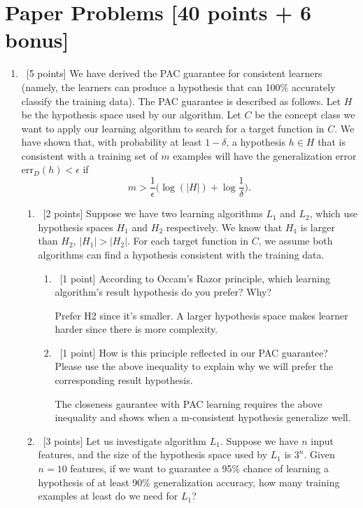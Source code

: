 \documentclass[12pt, fullpage,letterpaper]{article}
\begin{document}
\section{Paper Problems [40 points + 6 bonus]}
\begin{enumerate}
\item~[5 points] We have derived the PAC guarantee for consistent learners (namely, the learners can produce a hypothesis that can 100\% accurately classify the training data). The PAC guarantee is described as follows. Let $H$ be the hypothesis space used by our algorithm. Let $C$ be the concept class we want to apply our learning algorithm to search for a target function in $C$. We have shown that,  with probability at least $1-\delta$, a hypothesis $h\in H$ that is consistent with a training set of $m$ examples will have the generalization error $\mathrm{err}_D(h) < \epsilon$ if 
\[
m > \frac{1}{\epsilon}\big(\log(|H|) + \log\frac{1}{\delta}\big).
\]

\begin{enumerate}
	\item~[2 points] Suppose we have two learning algorithms $L_1$ and $L_2$, which use hypothesis spaces $H_1$ and $H_2$ respectively. We know that $H_1$ is larger than $H_2$, \ie $|H_1| > |H_2|$.
	For each target function in $C$, we assume both algorithms can find a hypothesis consistent with the training data. 
	\begin{enumerate}
		\item~[1 point] According to Occam's Razor principle, which learning algorithm's  result hypothesis do you prefer? Why? \newline

Prefer H2 since it's smaller. A larger hypothesis space makes learner harder since there is more complexity.

		\item~[1 point]  How is this principle reflected in our PAC guarantee? Please use the above inequality to explain why we will prefer the corresponding result hypothesis.  \newline

The closeness gaurantee with PAC learning requires the above inequality and shows when a m-consistent hypothesis generalize well. 
	\end{enumerate}
	\item~[3 points] Let us investigate algorithm $L_1$. Suppose we have $n$ input features, and the size of the hypothesis space used by $L_1$ is $3^n$. Given $n=10$ features, if we want to guarantee a 95\% chance of learning a hypothesis of at least 90\% generalization accuracy, how many training examples at least do we need for $L_1$? \newline


\end{enumerate}
\end{enumerate}
\end{document}
